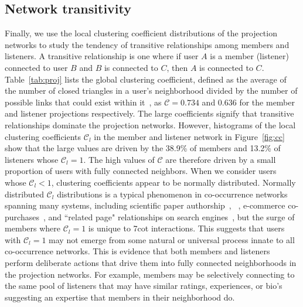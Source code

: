 \subsection{Network transitivity}
Finally, we use the local clustering coefficient distributions of the projection 
networks to study the tendency of transitive relationships among members
and listeners. A transitive relationship is one where if user $A$ is a 
member (listener) connected to user $B$ and $B$ is connected to $C$, then $A$
is connected to $C$. Table~\ref{tab:proj} lists the global clustering coefficient,
defined as the average of the number of closed triangles in a user's neighborhood 
divided by the number of possible links that could exist within 
it~\cite{watts1998collective}, as $\mathcal{C} = 0.734$ and $0.636$
for the member and listener projections respectively. The large  
coefficients signify that transitive relationships dominate the projection
networks. However, histograms of the local clustering coefficients $\mathcal{C}_l$ in the
member and listener network in Figure~\ref{fig:cc} show that the large values are driven 
by the 38.9\% of members and 13.2\% of listeners whose $\mathcal{C}_l = 1$. The high values
of $\mathcal{C}$ are therefore driven by a small proportion of users with fully
connected neighbors. 
When we consider users whose $\mathcal{C}_l < 1$, 
clustering coefficients appear to be normally distributed.  
Normally distributed $\mathcal{C}_l$ distributions is a typical phenomenon in co-occurrence
networks spanning many systems, including scientific paper authorship~\cite{yang2015defining}, ~\cite{leskovec2007graph}, e-commerce co-purchases~\cite{leskovec2007dynamics}, and ``related page" relationships on search engines~\cite{niu2011zhishi}, but the surge of members where $\mathcal{C}_l = 1$ is 
unique to 7cot interactions. 
This suggests that users with $\mathcal{C}_l = 1$ may not emerge from some natural or 
universal process innate to all co-occurrence networks. This is evidence that 
both members and listeners perform deliberate actions that drive them into fully connected 
neighborhoods in the projection networks. For example, members may be selectively
connecting to the same pool of listeners that may have similar ratings, 
experiences, or bio's suggesting an expertise that members in their neighborhood do.
 


